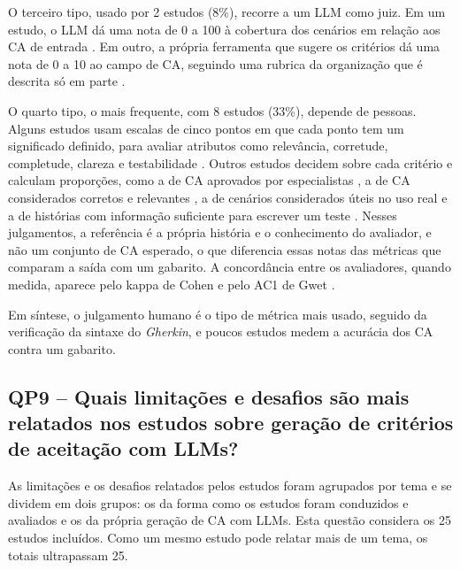 O terceiro tipo, usado por 2 estudos (8\%), recorre a um LLM como juiz. Em um estudo, o LLM dá uma nota de 0 a 100 à cobertura dos cenários em relação aos CA de entrada \cite{huang2026}. Em outro, a própria ferramenta que sugere os critérios dá uma nota de 0 a 10 ao campo de CA, seguindo uma rubrica da organização que é descrita só em parte \cite{baker2026}.

O quarto tipo, o mais frequente, com 8 estudos (33\%), depende de pessoas. Alguns estudos usam escalas de cinco pontos em que cada ponto tem um significado definido, para avaliar atributos como relevância, corretude, completude, clareza e testabilidade \cite{wang2025,hassani2026,zhang2024}. Outros estudos decidem sobre cada critério e calculam proporções, como a de CA aprovados por especialistas \cite{schwedt2025}, a de CA considerados corretos e relevantes \cite{spijkman2025}, a de cenários considerados úteis no uso real \cite{ferreira2025} e a de histórias com informação suficiente para escrever um teste \cite{brockenbrough2025,brockenbrough2024}. Nesses julgamentos, a referência é a própria história e o conhecimento do avaliador, e não um conjunto de CA esperado, o que diferencia essas notas das métricas que comparam a saída com um gabarito. A concordância entre os avaliadores, quando medida, aparece pelo kappa de Cohen e pelo AC1 de Gwet \cite{li2024,schwedt2025}.

Em síntese, o julgamento humano é o tipo de métrica mais usado, seguido da verificação da sintaxe do \textit{Gherkin}, e poucos estudos medem a acurácia dos CA contra um gabarito.

\subsection{QP9 -- Quais limitações e desafios são mais relatados nos estudos sobre geração de critérios de aceitação com LLMs?}
\label{sec:qp9}

As limitações e os desafios relatados pelos estudos foram agrupados por tema e se dividem em dois grupos: os da forma como os estudos foram conduzidos e avaliados e os da própria geração de CA com LLMs. Esta questão considera os 25 estudos incluídos. Como um mesmo estudo pode relatar mais de um tema, os totais ultrapassam 25.

